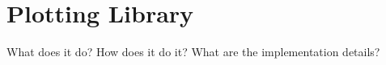 \documentclass[../00_main.tex]{subfiles}
\begin{document}
\section{Plotting Library}

What does it do? How does it do it? What are the implementation details?
\end{document}
